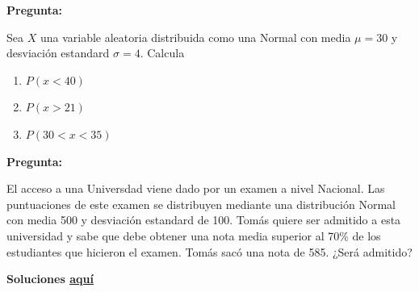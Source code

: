 \documentclass[]{article}
\numberwithin{equation}{section}
\begin{document}
\textbf{Pregunta:}

Sea \(X\) una variable aleatoria distribuida como una Normal con media
\(\mu = 30\) y desviación estandard \(\sigma = 4\). Calcula

\begin{enumerate}
\def\labelenumi{\alph{enumi})}
\item
  \(P(x<40)\)
\item
  \(P(x>21)\)
\item
  \(P(30<x<35)\)
\end{enumerate}

\textbf{Pregunta:}

El acceso a una Universdad viene dado por un examen a nivel Nacional.
Las puntuaciones de este examen se distribuyen mediante una distribución
Normal con media 500 y desviación estandard de 100. Tomás quiere ser
admitido a esta universidad y sabe que debe obtener una nota media
superior al 70\% de los estudiantes que hicieron el examen. Tomás sacó
una nota de 585. ¿Será admitido?

\textbf{Soluciones \href{IntroSM_sol.html}{aquí}}
\end{document}
